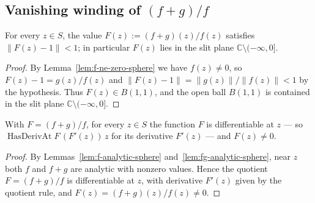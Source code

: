 \subsection{Vanishing winding of \texorpdfstring{$(f+g)/f$}{(f+g)/f}}

\begin{lemma}
    \label{lem:F-slitPlane}
    \leanok
    For every $z \in S$, the value $F(z) := (f+g)(z)/f(z)$ satisfies
    $\|F(z) - 1\| < 1$; in particular $F(z)$ lies in the slit plane
    $\mathbb{C}\setminus(-\infty,0]$.
\end{lemma}
\begin{proof}
    By Lemma~\ref{lem:f-ne-zero-sphere} we have $f(z) \neq 0$, so $F(z) - 1 =
    g(z)/f(z)$ and $\|F(z)-1\| = \|g(z)\|/\|f(z)\| < 1$ by the hypothesis. Thus
    $F(z) \in B(1,1)$, and the open ball $B(1,1)$ is contained in the slit plane
    $\mathbb{C}\setminus(-\infty,0]$.
\end{proof}

\begin{lemma}[$F = (f+g)/f$ is differentiable and nonzero on the circle]
    \label{lem:F-hasDerivAt}
    \leanok
    With $F = (f+g)/f$, for every $z \in S$ the function $F$ is differentiable at
    $z$ — so $\operatorname{HasDerivAt} F\,(F'(z))\,z$ for its derivative
    $F'(z)$ — and $F(z) \neq 0$.
\end{lemma}
\begin{proof}
    By Lemmas~\ref{lem:f-analytic-sphere} and~\ref{lem:fg-analytic-sphere}, near
    $z$ both $f$ and $f+g$ are analytic with nonzero values. Hence the quotient
    $F = (f+g)/f$ is differentiable at $z$, with derivative $F'(z)$ given by the
    quotient rule, and $F(z) = (f+g)(z)/f(z) \neq 0$.
\end{proof}

